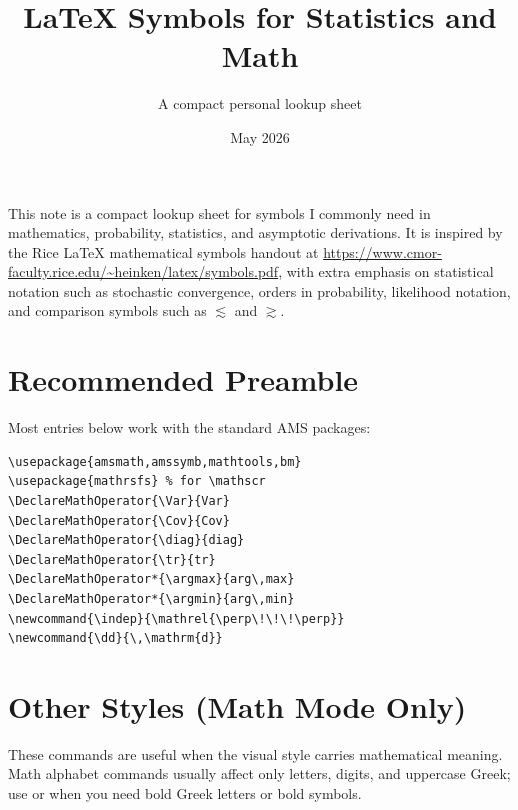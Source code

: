 \documentclass[10pt]{article}
\title{\vspace{-2.5em}LaTeX Symbols for Statistics and Math}
\author{A compact personal lookup sheet}
\date{May 2026}
\DeclareMathOperator{\Var}{Var}
\DeclareMathOperator{\Cov}{Cov}
\DeclareMathOperator{\diag}{diag}
\DeclareMathOperator{\tr}{tr}
\DeclareMathOperator*{\argmax}{arg\,max}
\DeclareMathOperator*{\argmin}{arg\,min}
\newcommand{\indep}{\mathrel{\perp\!\!\!\perp}}
\newcommand{\dd}{\,\mathrm{d}}
\newcommand{\code}[1]{\texttt{\detokenize{#1}}}
\begin{document}
\maketitle
\vspace{-1.3em}

This note is a compact lookup sheet for symbols I commonly need in
mathematics, probability, statistics, and asymptotic derivations.  It is
inspired by the Rice LaTeX mathematical symbols handout at
\url{https://www.cmor-faculty.rice.edu/~heinken/latex/symbols.pdf}, with
extra emphasis on statistical notation such as stochastic convergence,
orders in probability, likelihood notation, and comparison symbols such as
\(\lesssim\) and \(\gtrsim\).

\section*{Recommended Preamble}

Most entries below work with the standard AMS packages:
\begin{verbatim}
\usepackage{amsmath,amssymb,mathtools,bm}
\usepackage{mathrsfs} % for \mathscr
\DeclareMathOperator{\Var}{Var}
\DeclareMathOperator{\Cov}{Cov}
\DeclareMathOperator{\diag}{diag}
\DeclareMathOperator{\tr}{tr}
\DeclareMathOperator*{\argmax}{arg\,max}
\DeclareMathOperator*{\argmin}{arg\,min}
\newcommand{\indep}{\mathrel{\perp\!\!\!\perp}}
\newcommand{\dd}{\,\mathrm{d}}
\end{verbatim}

\section*{Other Styles (Math Mode Only)}

These commands are useful when the visual style carries mathematical
meaning.  Math alphabet commands usually affect only letters, digits, and
uppercase Greek; use \code{\boldsymbol} or \code{\bm} when you need bold
Greek letters or bold symbols.
\end{document}
